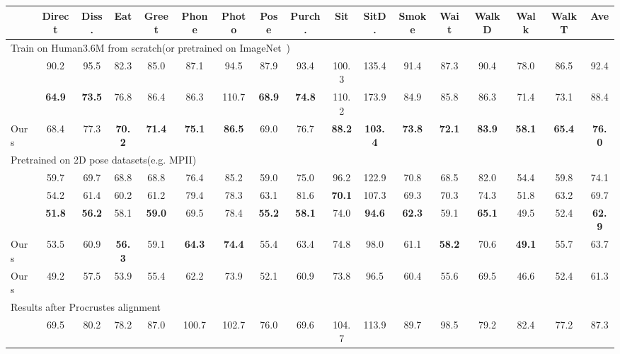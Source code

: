 \documentclass{bmvc2k}
\begin{document}
\begin{table*}[h]
\small
	\begin{center}
		\tabcolsep=0.02cm
		\begin{tabular}{|l|c|c|c|c|c|c|c|c|c|c|c|c|c|c|c|c|}
			\hline
			& Direct & Diss. & Eat & Greet & Phone &Photo & Pose & Purch.  & Sit & SitD. & Smoke & Wait & WalkD & Walk & WalkT & \textbf{Ave} \\
			\hline\hline
\multicolumn{17}{|l|}{Train on Human3.6M from scratch(or pretrained on ImageNet~\cite{Russakovsky2015})} \\ \hline
\cite{sun2017compositional} & 90.2 & 95.5 & 82.3 & 85.0 & 87.1 & 94.5 & 87.9 & 93.4 & 100.3 & 135.4 & 91.4 &  87.3 & 90.4 & 78.0 & 86.5 & 92.4\\
			\cite{tome2017lifting} & \textbf{64.9}  & \textbf{73.5} &  76.8  & 86.4  & 86.3 &  110.7 &  \textbf{68.9}  & \textbf{74.8}& 110.2 &  173.9 &  84.9 &  85.8  & 86.3  & 71.4 &  73.1  & 88.4 \\
			Ours & 68.4 & 77.3 & \textbf{70.2} & \textbf{71.4} &\textbf{75.1} & \textbf{86.5} &69.0 & 76.7 & \textbf{88.2} & \textbf{103.4} & \textbf{73.8} & \textbf{72.1} & \textbf{83.9} & \textbf{58.1} & \textbf{65.4} & \textbf{76.0}\\ \hline
			\multicolumn{17}{|l|}{Pretrained on 2D pose datasets(e.g. MPII)} \\ \hline
			\cite{mono-3dhp2017} & 59.7 & 69.7 & 68.8 & 68.8 & 76.4 & 85.2 & 59.0 & 75.0& 96.2 & 122.9 & 70.8 & 68.5 & 82.0 & 54.4 & 59.8 & 74.1 \\
			\cite{tekin2016fusing} & 54.2  & 61.4 & 60.2 & 61.2 &  79.4 & 78.3 &  63.1 &  81.6 &  \textbf{70.1} & 107.3 & 69.3 & 70.3 & 74.3 & 51.8  & 63.2 & 69.7\\
 \cite{martinez2017simple} & \textbf{51.8} &\textbf{56.2} & 58.1 & \textbf{59.0} & 69.5 & 78.4 & \textbf{55.2} & \textbf{58.1} & 74.0 & \textbf{94.6} & \textbf{62.3} & 59.1 & \textbf{65.1} &  49.5 & 52.4 & \textbf{62.9}\\
			Ours & 53.5 & 60.9 & \textbf{56.3} & 59.1 & \textbf{64.3} & \textbf{74.4} & 55.4 & 63.4 & 74.8 & 98.0 & 61.1 & \textbf{58.2} & 70.6 & \textbf{49.1} & 55.7 & 63.7\\ \hline
			Ours & 49.2 & 57.5 & 53.9 & 55.4 & 62.2 & 73.9 & 52.1 & 60.9 & 73.8 & 96.5 & 60.4 & 55.6 & 69.5 & 46.6 & 52.4 & 61.3\\ \hline \hline
            \multicolumn{17}{|l|}{Results after Procrustes alignment} \\ \hline
            \cite{moreno20163d} & 69.5& 80.2 &78.2 &87.0 &100.7&102.7& 76.0& 69.6 &104.7& 113.9& 89.7  &98.5& 79.2& 82.4 &77.2 & 87.3\\

\end{tabular}
\end{center}
\end{table*}
\end{document}
